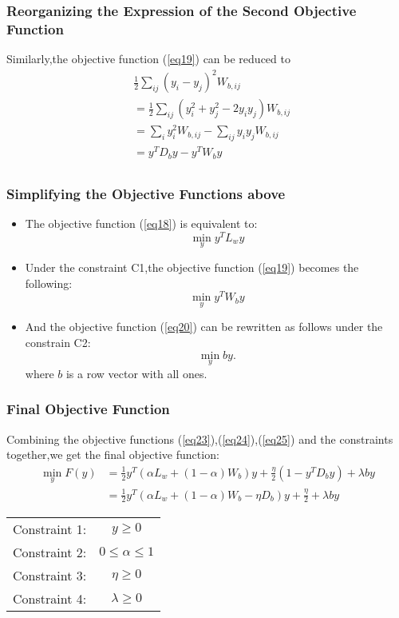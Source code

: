 \documentclass{beamer}
\begin{document}
\begin{frame}\frametitle{Reorganizing the Expression of the Second Objective Function}
Similarly,the objective function (\ref{eq19}) can be reduced to
\begin{equation}\label{eq22}
\begin{split}
&\frac{1}{2}\sum_{ij}(y_i-y_j)^2W_{b,ij}\\
&=\frac{1}{2}\sum_{ij}(y_i^2+y_j^2-2y_i y_j)W_{b,ij}\\
&=\sum_i y_i^2W_{b,ij}-\sum_{ij}y_i y_j W_{b,ij}\\
&=y^T D_b y-y^T W_b y\\
\end{split}
\end{equation}
\end{frame}


\begin{frame}\frametitle{Simplifying the Objective Functions above}
\begin{itemize}
\item The objective function (\ref{eq18}) is equivalent to:
\begin{equation}\label{eq23}
\min_y y^T L_w y
\end{equation}
\item Under the constraint C1,the objective function (\ref{eq19}) becomes the following:
\begin{equation}\label{eq24}
\min_y y^T W_b y
\end{equation}
\item And the objective function (\ref{eq20}) can be rewritten as follows under the constrain C2:
\begin{equation}\label{eq25}
\min_y by.
\end{equation}
where $b$ is a row vector with all ones.
\end{itemize}
\end{frame}


\begin{frame}\frametitle{Final Objective Function}
Combining the objective functions (\ref{eq23}),(\ref{eq24}),(\ref{eq25}) and the constraints together,we get the final objective function:
\begin{equation}\label{eq26}
\begin{split}
\min_y F(y)&=\frac{1}{2}y^T(\alpha L_w+(1-\alpha)W_b)y+\frac{\eta}{2}(1-y^TD_by)+\lambda by\\
&=\frac{1}{2}y^T(\alpha L_w+(1-\alpha)W_b-\eta D_b)y+\frac{\eta}{2}+\lambda by
\end{split}
\end{equation}
\begin{tabular}{c c}
Constraint 1:&$y\geq 0$\\
Constraint 2:&$0\leq\alpha\leq 1$\\
Constraint 3:&$\eta \geq 0$\\
Constraint 4:&$\lambda \geq 0$
\end{tabular}
\end{frame}
\end{document}
